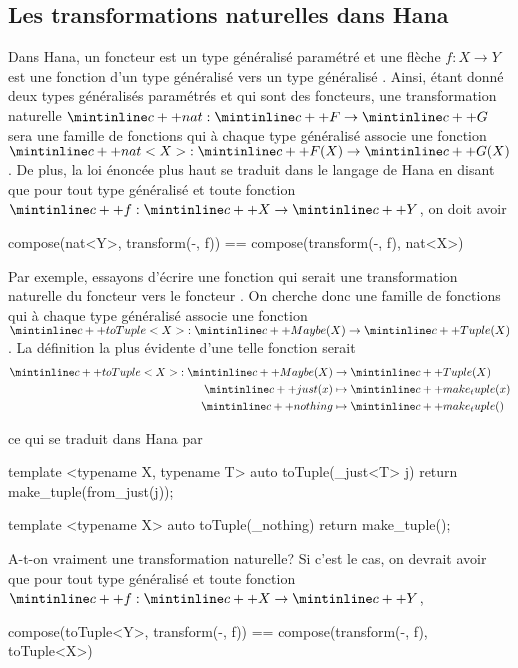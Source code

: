 \subsection{Les transformations naturelles dans Hana}
Dans Hana, un foncteur est un type généralisé paramétré et une flèche
$f : X \to Y$ est une fonction d'un type généralisé  vers un type
généralisé . Ainsi, étant donné deux types généralisés paramétrés
 et  qui sont des foncteurs, une transformation naturelle
$\icpp{nat} : \icpp{F} \to \icpp{G}$ sera une famille de fonctions qui à
chaque type généralisé  associe une fonction
$\icpp{nat<X>} : \icpp{F(X)} \to \icpp{G(X)}$. De plus, la loi
énoncée plus haut se traduit dans le langage de Hana en disant que pour tout
type généralisé  et toute fonction $\icpp{f} : \icpp{X} \to \icpp{Y}$,
on doit avoir
\begin{cpp}
    compose(nat<Y>, transform(-, f)) == compose(transform(-, f), nat<X>)
\end{cpp}

Par exemple, essayons d'écrire une fonction qui serait une transformation
naturelle du foncteur  vers le foncteur . On cherche
donc une famille de fonctions qui à chaque type généralisé  associe
une fonction $\icpp{toTuple<X>} : \icpp{Maybe(X)} \to \icpp{Tuple(X)}$. La
définition la plus évidente d'une telle fonction serait
\begin{align*}
    \icpp{toTuple<X>} : \icpp{Maybe(X)} &\to \icpp{Tuple(X)} \\
                        \icpp{just(x)} &\mapsto \icpp{make_tuple(x)} \\
                        \icpp{nothing} &\mapsto \icpp{make_tuple()}
\end{align*}

ce qui se traduit dans Hana par
\begin{cpp}
    template <typename X, typename T>
    auto toTuple(_just<T> j) {
        return make_tuple(from_just(j));
    }

    template <typename X>
    auto toTuple(_nothing) {
        return make_tuple();
    }
\end{cpp}

A-t-on vraiment une transformation naturelle? Si c'est le cas, on devrait
avoir que pour tout type généralisé  et toute fonction
$\icpp{f} : \icpp{X} \to \icpp{Y}$,
\begin{cpp}
    compose(toTuple<Y>, transform(-, f)) == compose(transform(-, f), toTuple<X>)
\end{cpp}

